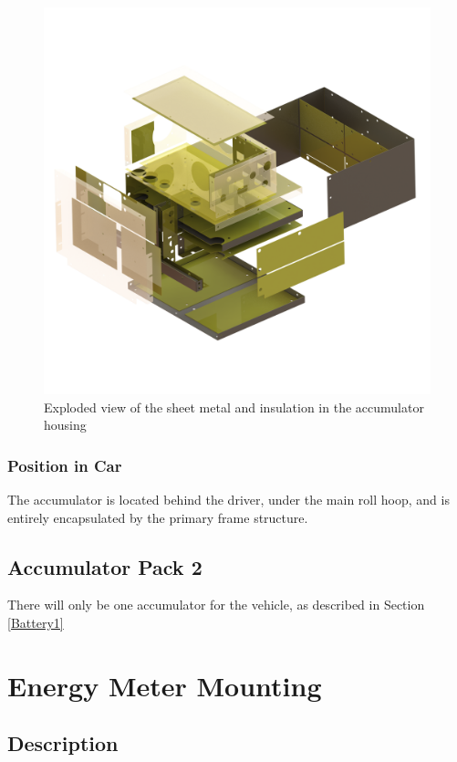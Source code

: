 \documentclass{article}
\begin{document}
            \begin{figure}[H]
                \centering
                \includegraphics[width = 0.5 \textwidth]{accumulator_insulation_frame_isoview}
                \caption{Exploded view of the sheet metal and insulation in the accumulator housing}
                \label{cellexp}
            \end{figure}

        \subsubsection{Position in Car}

        The accumulator is located behind the driver, under the main roll hoop, and is entirely encapsulated by the primary frame structure.

    \subsection{Accumulator Pack 2}
        There will only be one accumulator for the vehicle, as described in Section \ref{Battery1}

\newpage



\section{Energy Meter Mounting}

    \subsection{Description}

\end{document}
